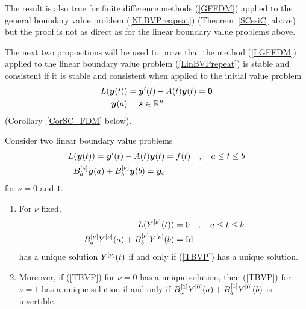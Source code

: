 The result is also true for finite difference
methods (\ref{GFFDM}) applied to the general boundary value problem
(\ref{NLBVPreapeat}) (Theorem~\ref{SCssiC} above) but the proof is
not as direct as for the linear boundary value problems above.

The next two propositions will be used to prove that the method
(\ref{LGFFDM}) applied to the linear boundary value problem
(\ref{LinBVPrepeat}) is stable and consistent if it is stable and
consistent when applied to the initial value problem 
\begin{align*}
L(\bm{y}(t)) &= \bm{y}'(t) - A(t) \bm{y}(t) = \bm{0} \\
\bm{y}(a) &= \bm{s} \in \mathbb{R}^n
\end{align*}
(Corollary~\ref{CorSC_FDM} below).

\begin{prop}
Consider two linear boundary value problems
\begin{equation} \label{TBVP}
\begin{split}
L(\bm{y}(t)) = \bm{y}'(t) - A(t)\bm{y}(t) &= f(t) \quad ,
\quad a \leq t \leq b\\
B_a^{[\nu]}\bm{y}(a) + B_b^{[\nu]}\bm{y}(b) = \bm{y}_c
\end{split}
\end{equation} 
for $\nu =0$ and $1$.
\begin{enumerate}
\item For $\nu$ fixed,
\begin{equation} \label{TBVPsyst}
\begin{split}
L(Y^{[\nu]}(t)) &= 0 \quad , \quad a \leq t \leq b \\
B_a^{[\nu]}Y^{[\nu]}(a) + B_b^{[\nu]}Y^{[\nu]}(b) &= \operatorname{Id}
\end{split}
\end{equation}
has a unique solution $\displaystyle Y^{[\nu]}(t)$ if and only if
(\ref{TBVP}) has a unique solution.
\item Moreover, if (\ref{TBVP}) for $\nu =0$ has a unique
solution, then (\ref{TBVP}) for $\nu =1$ has a unique solution if and
only if $\displaystyle B_a^{[1]} Y^{[0]}(a) + B_b^{[1]}Y^{[0]}(b)$ is
invertible.
\end{enumerate}
\label{BasicProp}
\end{prop}

